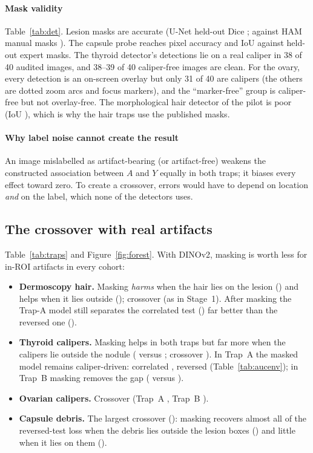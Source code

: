 \paragraph{Mask validity} Table~\ref{tab:det}. Lesion masks are accurate (U-Net held-out Dice \sThreeUnetDice; against
HAM manual masks \sThreeUnetHam). The capsule probe reaches pixel accuracy \sThreeProbeAcc{} and IoU \sThreeProbeIoU{}
against held-out expert masks. The thyroid detector's detections lie on a real caliper in 38 of 40 audited images, and
38--39 of 40 caliper-free images are clean. For the ovary, every detection is an on-screen overlay but only 31 of 40
are calipers (the others are dotted zoom arcs and focus markers), and the ``marker-free'' group is caliper-free but not
overlay-free. The morphological hair detector of the pilot is poor (IoU \sThreeHairDetIoU), which is why the hair traps
use the published masks.
\paragraph{Why label noise cannot create the result} An image mislabelled as artifact-bearing (or artifact-free)
weakens the constructed association between $A$ and $Y$ equally in both traps; it biases every effect toward zero. To
create a crossover, errors would have to depend on location \emph{and} on the label, which none of the detectors uses.


\subsection{The crossover with real artifacts}
Table~\ref{tab:traps} and Figure~\ref{fig:forest}. With DINOv2, masking is worth less for in-ROI artifacts in every
cohort:
\begin{itemize}[leftmargin=*]\itemsep1pt
\item \textbf{Dermoscopy hair.} Masking \emph{harms} when the hair lies on the lesion (\sThreeAisicDINOvTwo) and helps
when it lies outside (\sThreeBisicDINOvTwo); crossover \sThreeXisicDINOvTwo{} (as in Stage~1). After masking the Trap-A
model still separates the correlated test (\sThreeMaskCorrAisicDINOvTwo) far better than the reversed one
(\sThreeMaskRevAisicDINOvTwo).
\item \textbf{Thyroid calipers.} Masking helps in both traps but far more when the calipers lie outside the nodule
(\sThreeBthyroidDINOvTwo{} versus \sThreeAthyroidDINOvTwo; crossover \sThreeXthyroidDINOvTwo). In Trap~A the masked model
remains caliper-driven: correlated \sThreeAucThyroidtrapAmaskCorr, reversed \sThreeAucThyroidtrapAmaskRev{}
(Table~\ref{tab:aucenv}); in Trap~B masking removes the gap (\sThreeAucThyroidtrapBmaskCorr{} versus
\sThreeAucThyroidtrapBmaskRev).
\item \textbf{Ovarian calipers.} Crossover \sThreeXovaryDINOvTwo{} (Trap~A \sThreeAovaryDINOvTwo, Trap~B
\sThreeBovaryDINOvTwo).
\item \textbf{Capsule debris.} The largest crossover (\sThreeXcapsuleDINOvTwo): masking recovers almost all of the
reversed-test loss when the debris lies outside the lesion boxes (\sThreeBcapsuleDINOvTwo) and little when it lies on
them (\sThreeAcapsuleDINOvTwo).
\end{itemize}
